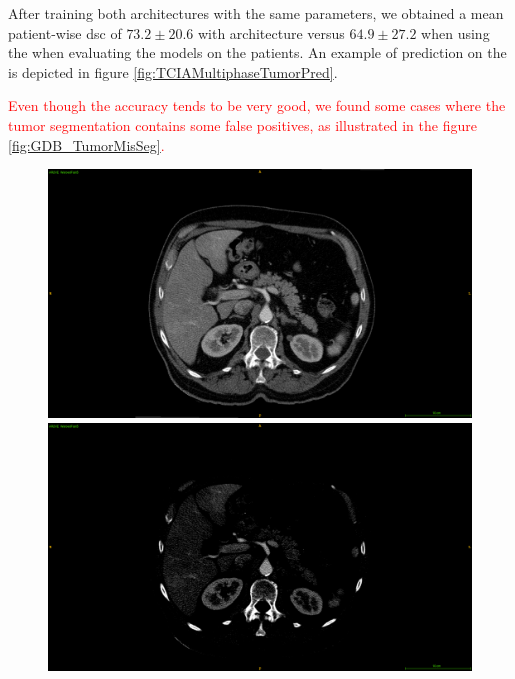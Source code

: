 After training both architectures with
the same parameters, we obtained a mean patient-wise \ac{dsc} of $ 73.2 \pm 20.6 $ with 
architecture versus $ 64.9 \pm 27.2 $ when using the  when evaluating the
models on the \textbf{} patients. An example of prediction on the \textbf{} is
depicted in figure \ref{fig:TCIAMultiphaseTumorPred}. 
\textcolor{red}
{
Even though the accuracy tends to be very good, we found some cases where the tumor segmentation contains some false positives, as illustrated in the figure \ref{fig:GDB_TumorMisSeg}.
\begin{figure}[!ht]
	\begin{mdframed}[backgroundcolor=blue!50,linecolor=blue!50]
		\centering
		\begin{minipage}{0.3\linewidth}
			\includegraphics[width=\linewidth]{images/MisSegmentations/TCGA-DD-A1ED_slice41_raw}
		\end{minipage} \hspace{-0.1cm}
		\begin{minipage}{0.3\linewidth}
			\includegraphics[width=\linewidth]{images/MisSegmentations/TCGA-DD-A1ED_slice41_raw_windowed}

\end{minipage}
\end{mdframed}
\end{figure}}
